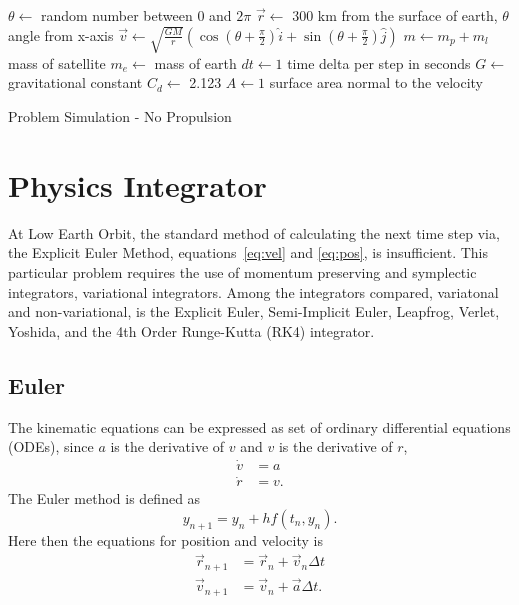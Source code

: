 \begin{algorithm}
	\SetAlgoLined
	\DontPrintSemicolon
	$\theta\leftarrow$ random number between $0$ and $2\pi$\;
	$\vec{r}\leftarrow$ 300 km from the surface of earth, $\theta$ angle from x-axis\;
	$\vec{v}\leftarrow \sqrt{\frac{GM}{r}}(\cos(\theta+\frac{\pi}{2})\hat{i}+\sin(\theta+\frac{\pi}{2})\hat{j})$ \;
	$m\leftarrow m_p+m_l$ mass of satellite\;
	$m_e\leftarrow$ mass of earth \;
	$dt\leftarrow 1$ time delta per step in seconds \;
	$G\leftarrow$ gravitational constant \;
	$C_d\leftarrow$ 2.123 \;
	$A\leftarrow1$ surface area normal to the velocity\;
	\caption{Problem Simulation - No Propulsion}\label{alg:problemsim}
\end{algorithm}

\section{Physics Integrator}

At Low Earth Orbit, the standard method of calculating the next time step via, the Explicit Euler Method, equations~\ref{eq:vel} and \ref{eq:pos}, is insufficient. This particular problem requires the use of momentum preserving and symplectic integrators, variational integrators. Among the integrators compared, variatonal and non-variational, is the Explicit Euler, Semi-Implicit Euler, Leapfrog, Verlet, Yoshida, and the 4th Order Runge-Kutta (RK4) integrator.

\subsection{Euler}
The kinematic equations can be expressed as set of ordinary differential equations (ODEs), since $a$ is the derivative of $v$ and $v$ is the derivative of $r$,
\begin{align*}
\dot{v}&=a\\
\dot{r}&=v.
\end{align*} The Euler method is defined as $$y_{n+1}=y_n+hf(t_n, y_n).$$ Here then the equations for position and velocity is 
\begin{align*}
\vec{r}_{n+1}&=\vec{r}_n+\vec{v}_n \Delta t\\
\vec{v}_{n+1}&=\vec{v}_n+\vec{a} \Delta t.
\end{align*}


